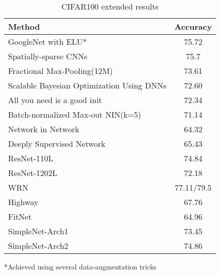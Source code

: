 \documentclass{article} \usepackage{lets_keepit_simple,times}
\begin{document}
\begin{table}[H]
\caption{CIFAR100 extended results}\label{tab:cifar100_appndx}
\begin{center}
\begin{tabular}{lc}
\textbf{Method} & \textbf{Accuracy}\\ \hline
GoogleNet with ELU\cite{Clevert_Fast_n_accurat_ELU_2015}* & 75.72 \\
Spatially-sparse CNNs\cite{Graham_Spatilly_sparse_CNN_2014} & 75.7 \\
Fractional Max-Pooling(12M) \cite{Graham_FractionalMaxpooling_2014} & 73.61 \\
\small{Scalable Bayesian Optimization Using DNNs}\cite{Snoek_ScalableBayesianoptemiz_2015} & 72.60 \\
All you need is a good init\cite{Mishkin_AllYouNeedIsGoodInit_2016} & 72.34 \\
Batch-normalized Max-out NIN(k=5)\cite{JiaRen_BatchNormMaxoutNIN_2015} & 71.14 \\
Network in Network\cite{Lin_NIN_2013} & 64.32 \\
Deeply Supervised Network\cite{Lee_DeeplySupervisedNet_2015} & 65.43 \\
ResNet-110L\cite{He_ResNet_2015} & 74.84 \\
ResNet-1202L\cite{He_ResNet_2015} & 72.18 \\
WRN\cite{Zagoruyko_WRN_2016} & 77.11/79.5 \\
Highway\cite{Srivastava_HighwayNets_2015} & 67.76 \\
FitNet\cite{Romero_Fitnet_2014} & 64.96 \\
SimpleNet-Arch1 & 73.45 \\
SimpleNet-Arch2 & 74.86 \\ \hline
\end{tabular}
\end{center}
\end{table}

*Achieved using several data-augmentation tricks
\end{document}
